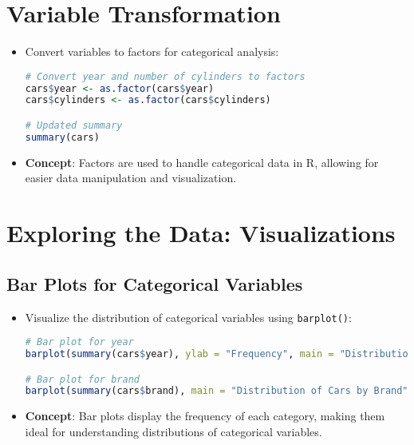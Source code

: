 \documentclass{article}
\begin{document}
\section{Variable Transformation}
\begin{itemize}
    \item Convert variables to factors for categorical analysis:
\begin{lstlisting}[language=R]
# Convert year and number of cylinders to factors
cars$year <- as.factor(cars$year)
cars$cylinders <- as.factor(cars$cylinders)

# Updated summary
summary(cars)
\end{lstlisting}
    \item \textbf{Concept}: Factors are used to handle categorical data in R, allowing for easier data manipulation and visualization.
\end{itemize}

\section{Exploring the Data: Visualizations}
\subsection{Bar Plots for Categorical Variables}
\begin{itemize}
    \item Visualize the distribution of categorical variables using \texttt{barplot()}:
\begin{lstlisting}[language=R]
# Bar plot for year
barplot(summary(cars$year), ylab = "Frequency", main = "Distribution of Cars by Year")

# Bar plot for brand
barplot(summary(cars$brand), main = "Distribution of Cars by Brand")
\end{lstlisting}
    \item \textbf{Concept}: Bar plots display the frequency of each category, making them ideal for understanding distributions of categorical variables.
\end{itemize}
\end{document}
